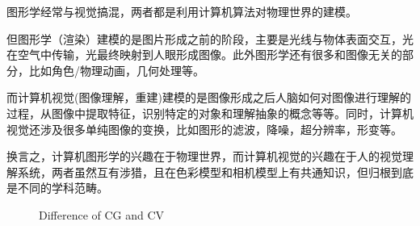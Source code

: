 图形学经常与视觉搞混，两者都是利用计算机算法对物理世界的建模。

但图形学（渲染）建模的是图片形成之前的阶段，主要是光线与物体表面交互，光在空气中传输，光最终映射到人眼形成图像。此外图形学还有很多和图像无关的部分，比如角色/物理动画，几何处理等。

而计算机视觉(图像理解，重建)建模的是图像形成之后人脑如何对图像进行理解的过程，从图像中提取特征，识别特定的对象和理解抽象的概念等等。同时，计算机视觉还涉及很多单纯图像的变换，比如图形的滤波，降噪，超分辨率，形变等。

换言之，计算机图形学的兴趣在于物理世界，而计算机视觉的兴趣在于人的视觉理解系统，两者虽然互有涉猎，且在色彩模型和相机模型上有共通知识，但归根到底是不同的学科范畴。

\begin{figure}[H]
    \centering
    
    \caption{Difference of CG and CV}
    \label{fig:diff_cg_cv}
\end{figure}